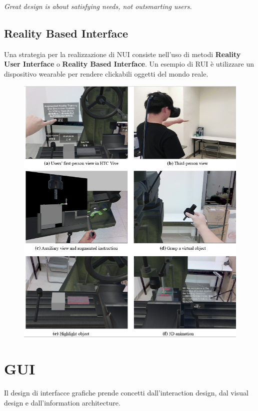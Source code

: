 \begin{flushleft}
	\textit{Great design is about satisfying needs, not outsmarting users.}
\end{flushleft}

\subsection*{Reality Based Interface}
Una strategia per la realizzazione di NUI consiste nell'uso di metodi \textbf{Reality User Interface} o \textbf{Reality Based Interface}.
Un esempio di RUI è utilizzare un dispositivo wearable per rendere clickabili oggetti del mondo reale.

\begin{figure}[!h]
	\centering
	\includegraphics[scale=0.5]{immagini/rbi-esempio.png}
\end{figure}

\section{GUI}
Il design di interfacce grafiche prende concetti dall'interaction design, dal visual design e dall'information architecture.


